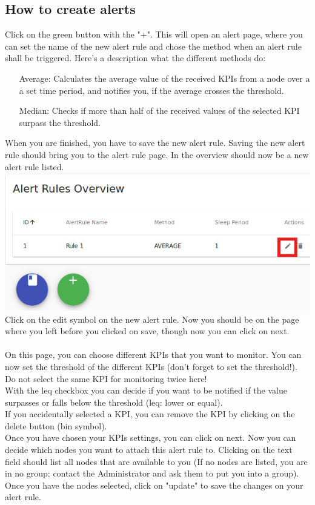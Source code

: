 \documentclass[twoside,a4paper]{refart}
\begin{document}
    \subsection{How to create alerts}
    Click on the green button with the "+". This will open an alert page,
    where you can set the name of the new alert rule and chose the method when an alert rule shall be triggered.
    Here's a description what the different methods do:
    \begin{itemize}
    \item[Average:] Calculates the average value of the received KPIs from a
    node over a a set time period, and notifies
    you, if the average crosses the threshold.
    \item[Median:] Checks if more than half of the received values of the
    selected KPI surpass the threshold.
    \end{itemize}
    When you are finished, you have to save the new alert rule. Saving the new alert rule should bring you to the alert rule page. In the overview should now be a new alert rule listed. \\
    \includegraphics[width=\linewidth]{alertedit.jpeg} \\
    Click on the edit symbol on the new alert rule. Now you should be on the page where you left before you clicked on save, though now you can click on next.\\ \\
    On this page, you can choose different KPIs that you want to monitor.
    You can now set the threshold of the different KPIs (don't forget to set the threshold!). Do not select the same KPI for monitoring twice here! \\
    With the leq checkbox you can decide if you want to be notified if the value surpasses or falls below the threshold (leq: lower or equal).\\
    If you accidentally selected a KPI, you can remove the KPI by clicking on the delete button (bin symbol). \\
    Once you have chosen your KPIs settings, you can click on next.
    Now you can decide which nodes you want to attach this alert rule to.
    Clicking on the text field should list all nodes that are available to you (If no nodes are listed, you are in no group; contact the Administrator and ask them to put you into a group).\\
    Once you have the nodes selected, click on "update" to save the changes on your alert rule.
    
\end{document}
